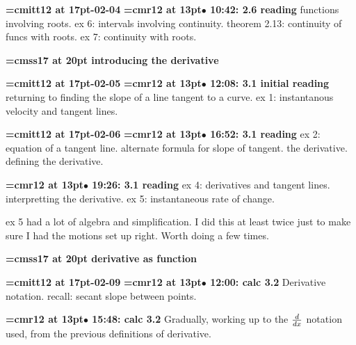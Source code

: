 {\medskip\noindent\bf\font\titlefont=cmitt12 at 17pt-02-04}\medskip
{\smallskip\noindent\bf\font\titlefont=cmr12 at 13pt\titlefont $\bullet$ 10:42: 2.6 reading}\smallskip
functions involving roots. ex 6: intervals involving continuity. theorem 2.13: continuity of funcs with roots. ex 7: continuity with roots.
\par

{\medskip\noindent\bf\font\titlefont=cmss17 at 20pt introducing the derivative}\medskip

{\medskip\noindent\bf\font\titlefont=cmitt12 at 17pt-02-05}\medskip
{\smallskip\noindent\bf\font\titlefont=cmr12 at 13pt\titlefont $\bullet$ 12:08: 3.1 initial reading}\smallskip
returning to finding the slope of a line tangent to a curve. ex 1: instantanous velocity and tangent lines.
\par

{\medskip\noindent\bf\font\titlefont=cmitt12 at 17pt-02-06}\medskip
{\smallskip\noindent\bf\font\titlefont=cmr12 at 13pt\titlefont $\bullet$ 16:52: 3.1 reading}\smallskip
ex 2: equation of a tangent line. alternate formula for slope of tangent. the derivative. defining the derivative.
\par

{\smallskip\noindent\bf\font\titlefont=cmr12 at 13pt\titlefont $\bullet$ 19:26: 3.1 reading}\smallskip
ex 4: derivatives and tangent lines. interpretting the derivative. ex 5: instantaneous rate of change.
\par

ex 5 had a lot of algebra and simplification. I did this at least twice just to make sure I had the motions set up right. Worth doing a few times.
\par

{\medskip\noindent\bf\font\titlefont=cmss17 at 20pt derivative as function}\medskip

{\medskip\noindent\bf\font\titlefont=cmitt12 at 17pt-02-09}\medskip
{\smallskip\noindent\bf\font\titlefont=cmr12 at 13pt\titlefont $\bullet$ 12:00: calc 3.2}\smallskip
Derivative notation. recall: secant slope between points.
\par

{\smallskip\noindent\bf\font\titlefont=cmr12 at 13pt\titlefont $\bullet$ 15:48: calc 3.2}\smallskip
Gradually, working up to the ${d \over dx}$ notation used, from the previous definitions of derivative.
\par

